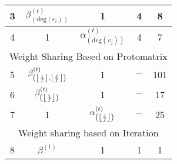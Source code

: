 \begin{table}[t]
\begin{tabular}{|c|c|c|c|c|}
    3                     & $\beta^{(t)}_{(\text{deg}{(c_i)})}$                                          & 1                                                  & 4                                                                   & 8                                                                \\ \hline
    4                     & 1                                                                  & $\alpha^{(t)}_{(\text{deg}{(v_j)})}$                      & 4                                                                   & 7                                                                \\ \hline
    \multicolumn{5}{|c|}{Weight Sharing Based on Protomatrix}                                                                                                                                                                                                                                   \\ \hline
    5\cite{dai2021learning}          & $\beta^{(t)}_{\left( \left\lfloor \frac{i}{f} \right\rfloor,\left\lfloor \frac{j}{f} \right\rfloor\right)}$ & 1                                                  & $-$                                                                 & 101                                                              \\ \hline
    6                     & $\beta^{(t)}_{\left( \left\lfloor \frac{i}{f} \right\rfloor\right)}$                     & 1                                                  & $-$                                                                 & 17                                                               \\ \hline
    7                     & 1                                                                       & $\alpha^{(t)}_{\left( \left\lfloor \frac{j}{f} \right\rfloor\right)}$ & $-$                                                                 & 25                                                               \\ \hline
    \multicolumn{5}{|c|}{Weight sharing based on Iteration  \cite {Lian2019-jh,Abotabl2019-wt}}                                                                                                                                                                                                          \\ \hline
    8                     & $\beta^{(t)}$                                                         & 1                                                  & 1                                                                   & 1                                                                \\ \hline
    \end{tabular}\label{tab:weight_sharing}
    \end{table}